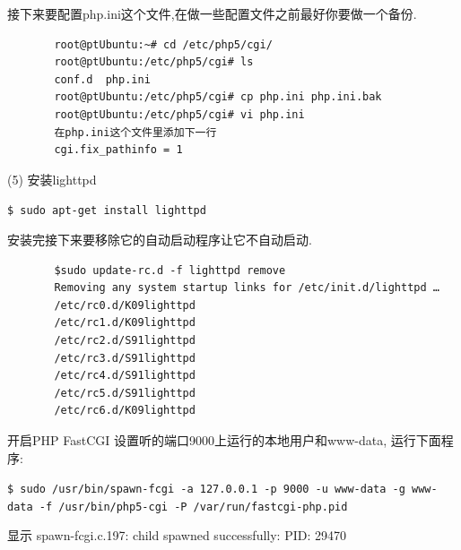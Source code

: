接下来要配置php.ini这个文件,在做一些配置文件之前最好你要做一个备份.
\begin{verbatim}
　　    root@ptUbuntu:~# cd /etc/php5/cgi/
　　    root@ptUbuntu:/etc/php5/cgi# ls
　　    conf.d  php.ini
　　    root@ptUbuntu:/etc/php5/cgi# cp php.ini php.ini.bak
　　    root@ptUbuntu:/etc/php5/cgi# vi php.ini
　　    在php.ini这个文件里添加下一行
　　    cgi.fix_pathinfo = 1
\end{verbatim}

(5) 安装lighttpd

\verb"$ sudo apt-get install lighttpd"

安装完接下来要移除它的自动启动程序让它不自动启动.
\begin{verbatim}
　　    $sudo update-rc.d -f lighttpd remove
　　    Removing any system startup links for /etc/init.d/lighttpd …
　　    /etc/rc0.d/K09lighttpd
　　    /etc/rc1.d/K09lighttpd
　　    /etc/rc2.d/S91lighttpd
　　    /etc/rc3.d/S91lighttpd
　　    /etc/rc4.d/S91lighttpd
　　    /etc/rc5.d/S91lighttpd
　　    /etc/rc6.d/K09lighttpd
\end{verbatim}

开启PHP FastCGI 设置听的端口9000上运行的本地用户和www-data, 运行下面程序:

\verb"$ sudo /usr/bin/spawn-fcgi -a 127.0.0.1 -p 9000 -u www-data -g www-data -f /usr/bin/php5-cgi -P /var/run/fastcgi-php.pid"

显示 spawn-fcgi.c.197: child spawned successfully: PID: 29470

